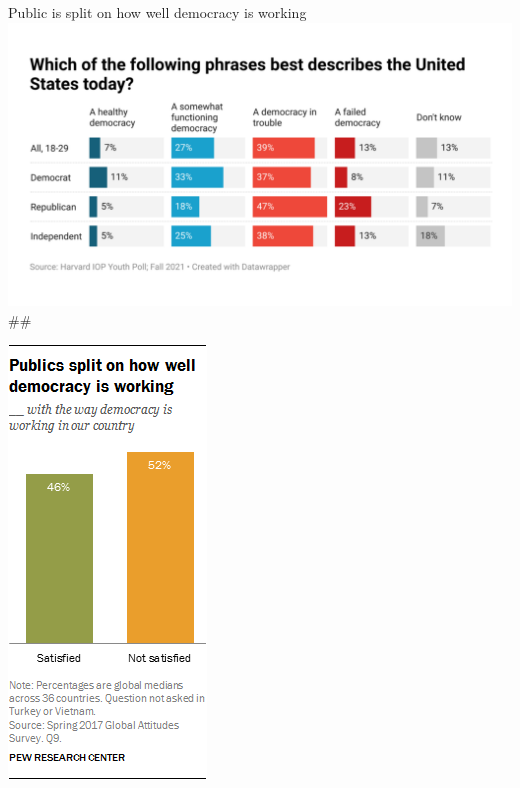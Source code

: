 \documentclass[
  ignorenonframetext,
  aspectratio=169]{beamer}
\begin{document}
\begin{frame}{Public is split on how well democracy is working}
\protect\hypertarget{public-is-split-on-how-well-democracy-is-working}{}
\includegraphics{img/demo-youth.png} \#\#

\includegraphics{img/demo-satisfaction.png}
\end{frame}
\end{document}

